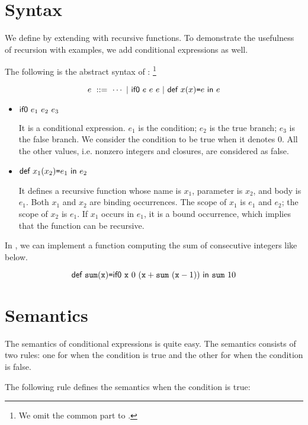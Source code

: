\section{Syntax}

We define \Lang by extending \plang with recursive functions. To demonstrate the
usefulness of recursion with examples, we add conditional expressions as well.

The following is the abstract syntax of \Lang:
\footnote{We omit the common part to \plang.}

\[
  e\ ::=\ \cdots\ |\ \eifz{e}{e}{e}\ |\ \erec{x}{x}{e}{e}
\]

\begin{itemize}
  \item $\textsf{if0}\ e_1\ e_2\ e_3$

    It is a conditional expression. $e_1$ is the condition; $e_2$ is the true
    branch; $e_3$ is the false branch. We consider the condition to be true when
    it denotes $0$. All the other values, i.e. nonzero integers and closures,
    are considered as false.

  \item $\textsf{def}\ x_1(x_2)\texttt{=} e_1\ \textsf{in}\ e_2$

    It defines a recursive function whose name is $x_1$, parameter is $x_2$, and
    body is $e_1$. Both $x_1$ and $x_2$ are binding occurrences. The scope of
    $x_1$ is $e_1$ and $e_2$; the scope of $x_2$ is $e_1$. If $x_1$ occurs in
    $e_1$, it is a bound occurrence, which implies that the function can be
    recursive.
\end{itemize}

In \Lang, we can implement a function computing the sum of consecutive integers
like below.

\[\textsf{def}\ \texttt{sum}(\texttt{x})\texttt{=}\textsf{if0}\ \texttt{x}\ 0\ (\texttt{x}+\texttt{sum}\ (\texttt{x}-1))\ \textsf{in}\ \texttt{sum}\ 10\]

\section{Semantics}

The semantics of conditional expressions is quite easy. The semantics consists
of two rules: one for when the condition is true and the other for when the
condition is false.

The following rule defines the semantics when the condition is true:


